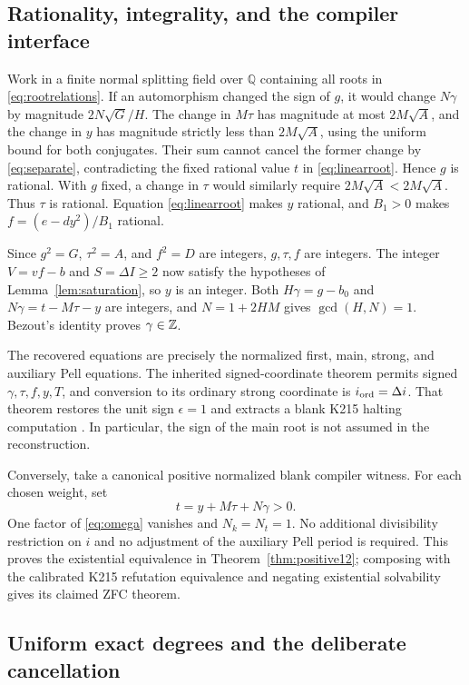 \subsection{Rationality, integrality, and the compiler interface}

Work in a finite normal splitting field over $\mathbb Q$ containing all
roots in \eqref{eq:rootrelations}. If an automorphism changed the sign of
$g$, it would change $N\gamma$ by magnitude $2N\sqrt G/H$.
The change in $M\tau$ has magnitude at most $2M\sqrt A$, and the change
in $y$ has magnitude strictly less than $2M\sqrt A$, using the uniform
bound for both conjugates. Their sum cannot cancel the former change by
\eqref{eq:separate}, contradicting the fixed rational value $t$ in
\eqref{eq:linearroot}. Hence $g$ is rational. With $g$ fixed, a change in
$\tau$ would similarly require $2M\sqrt A<2M\sqrt A$.
Thus $\tau$ is rational. Equation \eqref{eq:linearroot} makes $y$
rational, and $B_1>0$ makes $f=(e-dy^2)/B_1$ rational.

Since $g^2=G$, $\tau^2=A$, and $f^2=D$ are integers, $g,\tau,f$ are
integers. The integer $V=vf-b$ and $S=\Delta I\ge2$ now satisfy the
hypotheses of Lemma~\ref{lem:saturation}, so $y$ is an integer.
Both $H\gamma=g-b_0$ and $N\gamma=t-M\tau-y$ are integers, and
$N=1+2HM$ gives $\gcd(H,N)=1$. Bezout's identity proves
$\gamma\in\mathbb Z$.

The recovered equations are precisely the normalized first, main, strong,
and auxiliary Pell equations. The inherited signed-coordinate theorem
permits signed $\gamma,\tau,f,y,T$, and conversion to its ordinary strong
coordinate is $i_{\rm ord}=\Delta i$. That theorem restores the unit sign
$\epsilon=1$ and extracts a blank K215 halting computation
\cite{normalized,repo20,repo21}. In particular, the sign of the main root
is not assumed in the reconstruction.

Conversely, take a canonical positive normalized blank compiler witness.
For each chosen weight, set
\[
 t=y+M\tau+N\gamma>0.
\]
One factor of \eqref{eq:omega} vanishes and $N_k=N_t=1$.
No additional divisibility restriction on $i$ and no adjustment of the
auxiliary Pell period is required. This proves the existential equivalence
in Theorem~\ref{thm:positive12}; composing with the calibrated K215
refutation equivalence and negating existential solvability gives its
claimed ZFC theorem.

\subsection{Uniform exact degrees and the deliberate cancellation}

